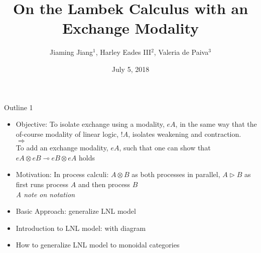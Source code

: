 \documentclass{beamer}
\title{On the Lambek Calculus with an Exchange Modality}
\subtitle{}
\date{July 5, 2018}
\author{Jiaming Jiang$^1$, Harley Eades III$^2$, Valeria de Paiva$^3$}
\institute{$^1$North Carolina State University; $^2$Augusta University; $^3$Nuance Communications}
\begin{document}
\maketitle


\begin{frame}{Outline 1}
\begin{itemize}
\item Objective: To isolate exchange using a modality, $eA$, in the same
      way that the of-course modality of linear logic, $!A$, isolates
      weakening and contraction. \\
      $\Rightarrow$ \\
      To add an exchange modality, $eA$, such that one can show
      that $eA\otimes eB\multimap eB\otimes eA$ holds
\item Motivation: In process calculi: $A\otimes B$ as both processes in
      parallel, $A\triangleright B$ as first runs process $A$ and then
      process $B$ \\
      \textit{A note on notation}
\item Basic Approach: generalize LNL model
\item Introduction to LNL model: with diagram
\item How to generalize LNL model to monoidal categories
\end{itemize}
\end{frame}
\end{document}
